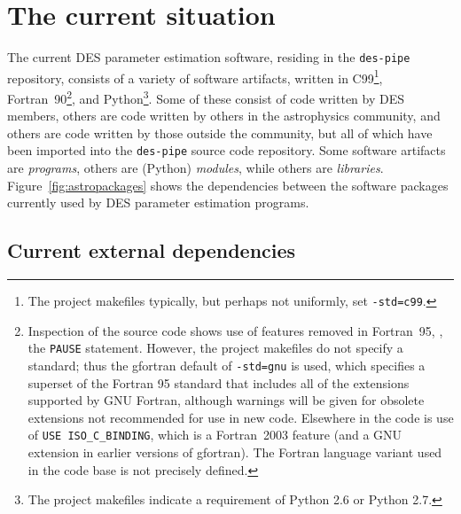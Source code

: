 \documentclass[draftmode,draftwater]{memarticle}
\begin{document}
\chapter{The current situation\label{ch:current_situation}}

The current DES parameter estimation software, residing in the
\texttt{des-pipe} repository, consists of a variety of software
artifacts, written in C99\footnote{The project makefiles typically, but
  perhaps not uniformly, set \texttt{-std=c99}.},
Fortran~90\footnote{Inspection of the source code shows use of features
  removed in Fortran~95, \eg, the \texttt{PAUSE} statement. However, the
  project makefiles do not specify a standard; thus the gfortran default
  of \texttt{-std=gnu} is used, which specifies a superset of the
  Fortran 95 standard that includes all of the extensions supported by
  GNU Fortran, although warnings will be given for obsolete extensions
  not recommended for use in new code. Elsewhere in the code is
use of \texttt{USE ISO\_C\_BINDING}, which is a Fortran~2003 feature
(and a GNU extension in earlier versions of gfortran). The Fortran
language variant used in the code base is not precisely defined.},
 and Python\footnote{The project makefiles indicate a requirement of
   Python 2.6 or Python 2.7.}.
Some of these consist of code written by DES members, others are code
written by others in the astrophysics community, and others are code
written by those outside the community, but all of which have been
imported into the \texttt{des-pipe} source code repository. Some software artifacts are
\emph{programs}, others are (Python) \emph{modules}, while others are
\emph{libraries}. Figure~\ref{fig:astropackages} shows the dependencies
between the software packages currently used by DES parameter estimation
programs.

\section{Current external dependencies}
\end{document}
